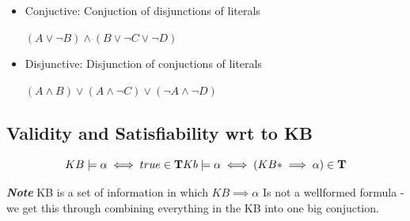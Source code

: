 \documentclass{article}
\theoremstyle{mytheoremstyle}
\theoremstyle{mytheoremstyle}
\theoremstyle{myproblemstyle}
\begin{document}
\begin{itemize}
	\item Conjuctive:
	      Conjuction of disjunctions of literals
	      \begin{definition}[CNF]

		      \( (A \lor  \neg B) \land (B \lor  \neg C \lor \neg D)\)
	      \end{definition}
	\item Disjunctive:
	      Disjunction of conjuctions of literals
	      \begin{definition}[DNF]
		      \begin{math}
			      (A \land B) \lor (A \land \neg C)\lor (\neg A \land \neg D)
		      \end{math}

	      \end{definition}
\end{itemize}
\subsection{Validity and Satisfiability wrt to KB}
\begin{theorem}
	\begin{displaymath}
		KB \models \alpha \iff true \in \mathbf{T}\\
		Kb \models \alpha  \iff (KB* \implies \alpha ) \in \mathbf{T}
	\end{displaymath}
\end{theorem}
\textbf{\textit{Note}} KB is a set of information in which \( KB \implies \alpha  \) Is not a wellformed formula - we get this through combining everything in the KB into one big conjuction.
\end{document}
